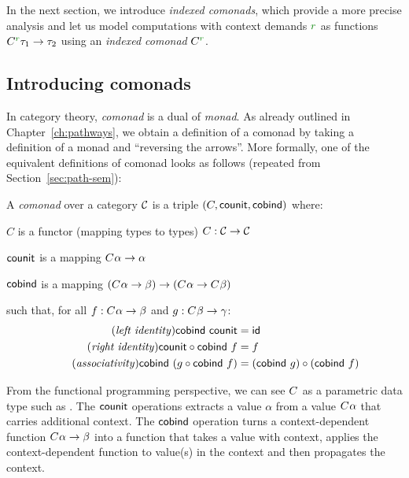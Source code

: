 In the next section, we introduce \emph{indexed comonads}, which provide a more precise analysis
and let us model computations with context demands $\cclrd{r}$ as functions
$\ctyp{\cclrd{r}}{\tau_1} \rightarrow \tau_2$ using an \emph{indexed comonad} $\ctyp{\cclrd{r}}{}$.


\subsection{Introducing comonads}

In category theory, \emph{comonad} is a dual of \emph{monad}. As already outlined in
Chapter~\ref{ch:pathways}, we obtain a definition of a comonad by taking a definition of a monad
and ``reversing the arrows''. More formally, one of the equivalent definitions of comonad
looks as follows (repeated from Section~\ref{sec:path-sem}):

\begin{definition}
A \emph{comonad} over a category $\mathcal{C}$ is a triple $(C, \textnormal{\sffamily counit}, \textnormal{\sffamily cobind})$ where:
\begin{compactitem}
\item $C$ is a functor (mapping types to types) $C : \mathcal{C} \rightarrow \mathcal{C}$
\item $\textnormal{\sffamily counit}$ is a mapping $C^{}\alpha \rightarrow \alpha$
\item $\textnormal{\sffamily cobind}$ is a mapping $(C^{}\alpha \rightarrow \beta)
  \rightarrow (C^{}\alpha \rightarrow C^{}\beta)$
\end{compactitem}
such that, for all $f:C^{}\alpha \rightarrow \beta$ and $g:C^{}\beta \rightarrow \gamma$:
\begin{align}
\tag{\emph{left identity}}
  \ident{cobind}~\ident{counit} &= \idf{}
  \\
\tag{\emph{right identity}}
  \ident{counit} \circ \ident{cobind}~f &= f
  \\
\tag{\emph{associativity}}
  \ident{cobind}~(g \circ \ident{cobind}~f) &= (\ident{cobind}~g) \circ (\ident{cobind}~f)
\end{align}
\end{definition}

\noindent
From the functional programming perspective, we can see $C^{}$ as a parametric data type such as
. The $\textnormal{\sffamily counit}$ operations extracts a value $\alpha$ from a value $C^{}\alpha$ 
that carries additional context. The $\textnormal{\sffamily cobind}$ operation turns a context-dependent function
$C^{}\alpha \rightarrow \beta$ into a function that takes a value with context, applies
the context-dependent function to value(s) in the context and then propagates the context.

